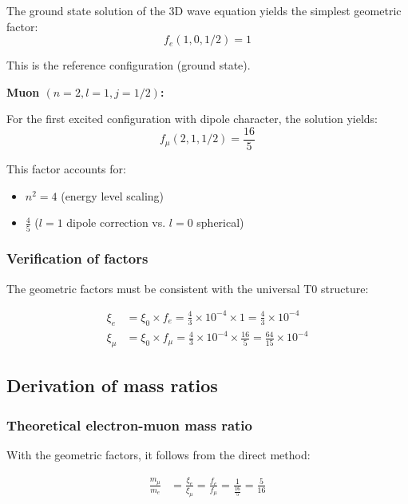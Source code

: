 \documentclass[12pt,a4paper]{article}
\begin{document}
The ground state solution of the 3D wave equation yields the simplest geometric factor:
\begin{equation}
	f_e(1,0,1/2) = 1
\end{equation}

This is the reference configuration (ground state).

\textbf{Muon $(n=2, l=1, j=1/2)$:}

For the first excited configuration with dipole character, the solution yields:
\begin{equation}
	f_\mu(2,1,1/2) = \frac{16}{5}
\end{equation}

This factor accounts for:
\begin{itemize}
	\item $n^2 = 4$ (energy level scaling)
	\item $\frac{4}{5}$ ($l=1$ dipole correction vs. $l=0$ spherical)
\end{itemize}

\subsubsection{Verification of factors}

The geometric factors must be consistent with the universal T0 structure:

\begin{align}
	\xi_e &= \xi_0 \times f_e = \frac{4}{3} \times 10^{-4} \times 1 = \frac{4}{3} \times 10^{-4}\\
	\xi_\mu &= \xi_0 \times f_\mu = \frac{4}{3} \times 10^{-4} \times \frac{16}{5} = \frac{64}{15} \times 10^{-4}
\end{align}

\subsection{Derivation of mass ratios}

\subsubsection{Theoretical electron-muon mass ratio}

With the geometric factors, it follows from the direct method:

\begin{align}
	\frac{m_\mu}{m_e} &= \frac{\xi_e}{\xi_\mu} = \frac{f_e}{f_\mu} = \frac{1}{\frac{16}{5}} = \frac{5}{16}
\end{align}
\end{document}
